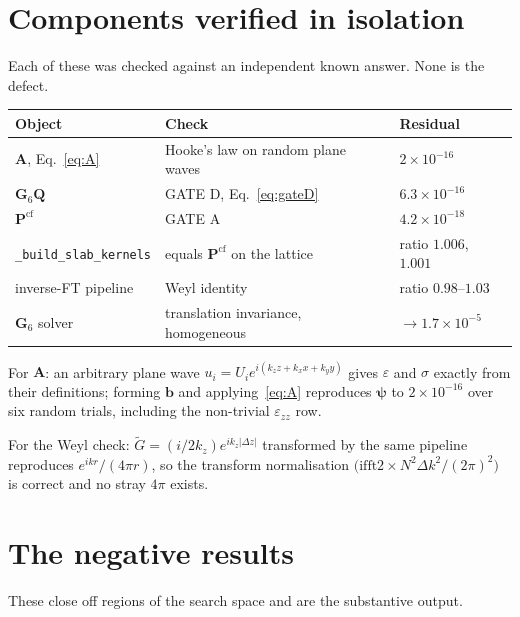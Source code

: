 \documentclass[11pt,a4paper]{article}
\newcommand{\bQ}{\mathbf{Q}}
\newcommand{\bA}{\mathbf{A}}
\newcommand{\bG}{\mathbf{G}}
\newcommand{\bP}{\mathbf{P}}
\begin{document}
\section{Components verified in isolation}

Each of these was checked against an independent known answer.  None is the
defect.

\begin{center}
\begin{tabular}{lll}
\toprule
Object & Check & Residual \\
\midrule
$\bA$, Eq.~\eqref{eq:A} & Hooke's law on random plane waves & $2\times10^{-16}$ \\
$\bG_6\bQ$ & GATE D, Eq.~\eqref{eq:gateD} & $6.3\times10^{-16}$ \\
$\bP^{\text{cf}}$ & GATE A & $4.2\times10^{-18}$ \\
\texttt{\_build\_slab\_kernels} & equals $\bP^{\text{cf}}$ on the lattice & ratio $1.006$, $1.001$ \\
inverse-FT pipeline & Weyl identity & ratio $0.98$--$1.03$ \\
$\bG_6$ solver & translation invariance, homogeneous & $\to 1.7\times10^{-5}$ \\
\bottomrule
\end{tabular}
\end{center}

For $\bA$: an arbitrary plane wave $u_i = U_i e^{i(k_zz+k_xx+k_yy)}$ gives
$\varepsilon$ and $\sigma$ exactly from their definitions; forming $\mathbf{b}$
and applying~\eqref{eq:A} reproduces $\boldsymbol{\psi}$ to $2\times10^{-16}$
over six random trials, including the non-trivial $\varepsilon_{zz}$ row.

For the Weyl check: $\tilde{G} = (i/2k_z)e^{ik_z|\Delta z|}$ transformed by the
same pipeline reproduces $e^{ikr}/(4\pi r)$, so the transform normalisation
$\bigl(\text{ifft2}\times N^2\Delta k^2/(2\pi)^2\bigr)$ is correct and no
stray $4\pi$ exists.

\section{The negative results}

These close off regions of the search space and are the substantive output.
\end{document}

